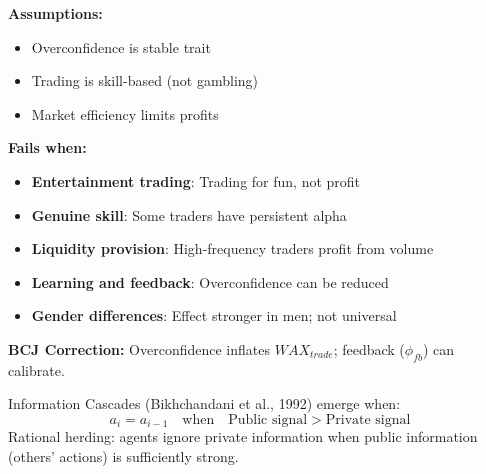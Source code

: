 \begin{tcolorbox}[colback=red!5!white, colframe=red!75!black, title=Boundary Condition: Where Overconfidence Model Fails]
\textbf{Assumptions:}
\begin{itemize}[nosep]
\item Overconfidence is stable trait
\item Trading is skill-based (not gambling)
\item Market efficiency limits profits
\end{itemize}

\textbf{Fails when:}
\begin{itemize}[nosep]
\item \textbf{Entertainment trading}: Trading for fun, not profit
\item \textbf{Genuine skill}: Some traders have persistent alpha
\item \textbf{Liquidity provision}: High-frequency traders profit from volume
\item \textbf{Learning and feedback}: Overconfidence can be reduced
\item \textbf{Gender differences}: Effect stronger in men; not universal
\end{itemize}

\textbf{BCJ Correction:} Overconfidence inflates $WAX_{trade}$; feedback ($\phi_{fb}$) can calibrate.
\end{tcolorbox}


\begin{theorem}
\label{thm:herding}
Information Cascades (Bikhchandani et al., 1992) emerge when:
\begin{equation}
\boxed{a_i = a_{i-1} \quad \text{when} \quad \text{Public signal} > \text{Private signal}}
\end{equation}
Rational herding: agents ignore private information when public information (others' actions) is sufficiently strong.
\end{theorem}


